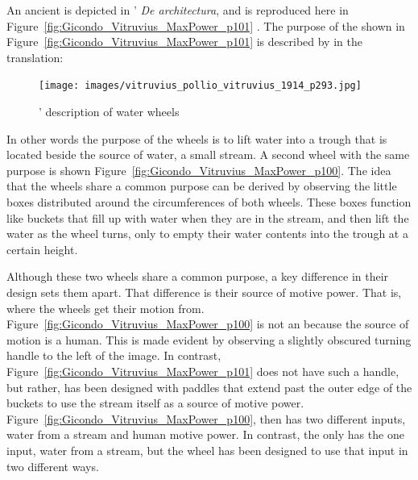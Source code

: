 \documentclass[a4paper, 12pt]{article}
\begin{document}
An ancient \SEs is depicted in \citeauthor{vitruvius_architectura_1511}' \textit{De architectura}, and is reproduced here in Figure~\ref{fig:Gicondo_Vitruvius_MaxPower_p101} \citep[p.~101]{vitruvius_architectura_1511}. The purpose of the \SEs shown in Figure~\ref{fig:Gicondo_Vitruvius_MaxPower_p101} is described by \citeauthor{vitruvius_pollio_vitruvius_1914} in the \citeyear{vitruvius_pollio_vitruvius_1914} translation:

\begin{figure}
    \centering
        \texttt{[image: images/vitruvius\_pollio\_vitruvius\_1914\_p293.jpg]}
        \caption{\citeauthor{vitruvius_pollio_vitruvius_1914}' description of water wheels \citep[p.~293]{vitruvius_pollio_vitruvius_1914}} \label{fig:vitruvius_pollio_vitruvius_1914_p293}
\end{figure}

In other words the purpose of the wheels is to lift water into a trough that is located beside the source of water, a small stream. A second wheel with the same purpose is shown Figure~\ref{fig:Gicondo_Vitruvius_MaxPower_p100}. The idea that the wheels share a common purpose can be derived by observing the little boxes distributed around the circumferences of both wheels. These boxes function like buckets that fill up with water when they are in the stream, and then lift the water as the wheel turns, only to empty their water contents into the trough at a certain height. 

Although these two wheels share a common purpose, a key difference in their design sets them apart. That difference is their source of motive power. That is, where the wheels get their motion from. Figure~\ref{fig:Gicondo_Vitruvius_MaxPower_p100} is not an \SEs because the source of motion is a human. This is made evident by observing a slightly obscured turning handle to the left of the image. In contrast, Figure~\ref{fig:Gicondo_Vitruvius_MaxPower_p101} does not have such a handle, but rather, has been designed with paddles that extend past the outer edge of the buckets to use the stream itself as a source of motive power. Figure~\ref{fig:Gicondo_Vitruvius_MaxPower_p100}, then has two different inputs, water from a stream and human motive power. In contrast, the \SEs only has the one input, water from a stream, but the wheel has been designed to use that input in two different ways.
\end{document}
